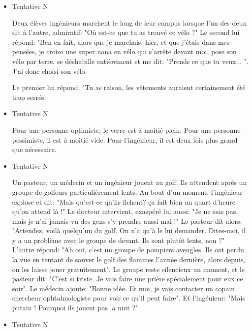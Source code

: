\begin{itemize}

	\item Tentative N

	Deux élèves ingénieurs marchent le long de leur campus lorsque l'un des deux dit à l'autre, admiratif: "Où est-ce que tu as trouvé ce vélo ?" Le second lui répond: "Ben en fait, alors que je marchais, hier, et que j'étais dans mes pensées, je croise une super nana en vélo qui s'arrête devant moi, pose son vélo par terre, se déshabille entièrement et me dit: "Prends ce que tu veux... ". J'ai donc choisi son vélo. 
	
	Le premier lui répond: "Tu as raison, les vêtements auraient certainement été trop serrés.

	\item Tentative N 

	Pour une personne optimiste, le verre est à moitié plein.
	Pour une personne pessimiste, il est à moitié vide.
	Pour l'ingénieur, il est deux fois plus grand que nécessaire.

	\item Tentative N 

	Un pasteur, un médecin et un ingénieur jouent au golf. Ils attendent après un groupe de golfeurs particulièrement lents. Au bout d'un moment, l'ingénieur explose et dit: "Mais qu'est-ce qu'ils fichent? ça fait bien un quart d'heure qu'on attend là !" Le docteur intervient, exaspéré lui aussi: "Je ne sais pas, mais je n'ai jamais vu des gens s'y prendre aussi mal !" Le pasteur dit alors: "Attendez, voilà quelqu'un du golf. On n'a qu'à le lui demander. Dites-moi, il y a un problème avec le groupe de devant. Ils sont plutôt lents, non ?" L'autre répond: "Ah oui, c'est un groupe de pompiers aveugles. Ils ont perdu la vue en tentant de sauver le golf des flammes l'année dernière, alors depuis, on les laisse jouer gratuitement". Le groupe reste silencieux un moment, et le pasteur dit: "C'est si triste. Je vais faire une prière spécialement pour eux ce soir". Le médecin ajoute: "Bonne idée. Et moi, je vais contacter un copain chercheur ophtalmologiste pour voir ce qu'il peut faire". Et l'ingénieur: "Mais putain ! Pourquoi ils jouent pas la nuit ?"

	\item Tentative N 


\end{itemize}
